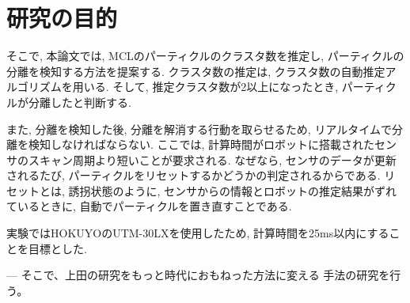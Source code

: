 \chapter{研究の目的}\label{chap:purpose}

そこで, 本論文では, MCLのパーティクルのクラスタ数を推定し, パーティクルの分離を検知する方法を提案する. 
クラスタ数の推定は, クラスタ数の自動推定アルゴリズムを用いる.
そして, 推定クラスタ数が2以上になったとき, パーティクルが分離したと判断する.

また, 分離を検知した後, 分離を解消する行動を取らせるため, リアルタイムで分離を検知しなければならない.
ここでは, 計算時間がロボットに搭載されたセンサのスキャン周期より短いことが要求される. 
なぜなら, センサのデータが更新されるたび, パーティクルをリセットするかどうかの判定されるからである.
リセットとは, 誘拐状態のように, センサからの情報とロボットの推定結果がずれているときに, 自動でパーティクルを置き直すことである.

実験ではHOKUYOのUTM-30LXを使用したため, 計算時間を25ms以内にすることを目標とした.

---
そこで、上田の研究をもっと時代におもねった方法に変える
手法の研究を行う。

